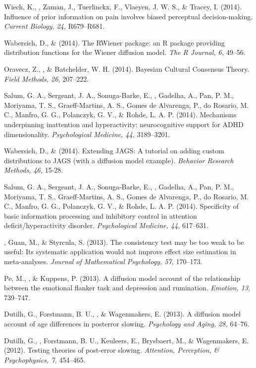 \item[22.] Wiech, K., \vdkh{}, Zaman, J., Tuerlinckx, F., Vlaeyen, J. W. S., \& Tracey, I. (2014). Influence of prior information on pain involves biased perceptual decision-making. {\em Current Biology, 24,} R679--R681.
\item[21.] Wabersich, D., \& \vdkh{} (2014). The RWiener package: an R package providing distribution functions for the Wiener diffusion model. {\em The R Journal, 6,} 49--56.
\item[20.] Oravecz, Z., \vdkh{}, \& Batchelder, W. H. (2014). Bayesian Cultural Consensus Theory. {\em Field Methods, 26,} 207--222.
\item[19.] Salum, G. A., Sergeant, J. A., Sonuga-Barke, E., \vdkh{}, Gadelha, A., Pan, P. M., Moriyama, T. S., Graeff-Martins, A. S., Gomes de Alvarenga, P., do Rosario, M. C., Manfro, G. G., Polanczyk, G. V., \& Rohde, L. A. P. (2014). Mechanisms underpinning inattention and hyperactivity: neurocognitive support for ADHD dimensionality. {\em Psychological Medicine, 44,} 3189--3201.
\item[18.] Wabersich, D., \& \vdkh{} (2014). Extending JAGS: A tutorial on adding custom distributions to JAGS (with a diffusion model example). {\em Behavior Research Methods, 46,} 15-28.
\item[17.] Salum, G. A., Sergeant, J. A., Sonuga-Barke, E., \vdkh{}, Gadelha, A., Pan, P. M., Moriyama, T. S., Graeff-Martins, A. S., Gomes de Alvarenga, P., do Rosario, M. C., Manfro, G. G., Polanczyk, G. V., \& Rohde, L. A. P. (2014). Specificity of basic information processing and inhibitory control in attention deficit/hyperactivity disorder. {\em Psychological Medicine, 44,} 617--631.
\item[16.] \vdkh{}, Guan, M., \& Styrcula, S. (2013). The consistency test may be too weak to be useful: Its systematic application would not improve effect size estimation in meta-analyses. {\em Journal of Mathematical Psychology, 57,} 170--173.
\item[15.] Pe, M., \vdkh{}, \& Kuppens, P. (2013). A diffusion model account of the relationship between the emotional flanker task and depression and rumination. {\em Emotion, 13,} 739--747.
\item[14.] Dutilh, G., Forstmann, B. U., \vdkh{}, \& Wagenmakers, E. (2013). A diffusion model account of age differences in posterror slowing. {\em Psychology and Aging, 28,} 64--76.
\item[13.] Dutilh, G., \vdkh{}, Forstmann, B. U., Keuleers, E., Brysbaert, M., \& Wagenmakers, E. (2012). Testing theories of post-error slowing. {\em Attention, Perception, \& Psychophysics, 7,} 454--465.
